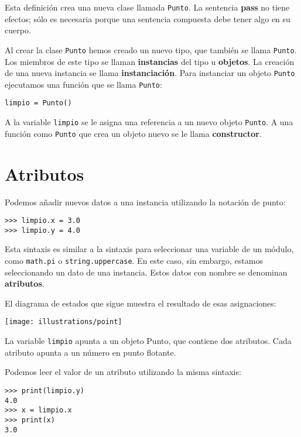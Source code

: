 Esta definición crea una nueva clase llamada \texttt{Punto}. La sentencia
\textbf{pass} no tiene efectos; sólo es necesaria porque una sentencia
compuesta debe tener algo en su cuerpo.

Al crear la clase \texttt{Punto} hemos creado un nuevo tipo, que también
se llama \texttt{Punto}. Los miembros de este tipo se llaman \textbf{instancias}
del tipo u \textbf{objetos}. La creación de una nueva instancia se
llama \textbf{instanciación}. Para instanciar un objeto \texttt{Punto}
ejecutamos una función que se llama \texttt{Punto}:

  
\begin{lstlisting}
limpio = Punto()
\end{lstlisting}

A la variable \texttt{limpio} se le asigna una referencia a un nuevo
objeto \texttt{Punto}. A una función como \texttt{Punto} que crea
un objeto nuevo se le llama \textbf{constructor}.

\section{Atributos}


Podemos añadir nuevos datos a una instancia utilizando la notación
de punto:
\begin{lstlisting}
>>> limpio.x = 3.0
>>> limpio.y = 4.0
\end{lstlisting}

Esta sintaxis es similar a la sintaxis para seleccionar una variable
de un módulo, como \texttt{math.pi} o \texttt{string.uppercase}. En
este caso, sin embargo, estamos seleccionando un dato de una instancia.
Estos datos con nombre se denominan \textbf{atributos}.

El diagrama de estados que sigue muestra el resultado de esas asignaciones:

\beforefig \centerline{\texttt{[image: illustrations/point]}}
\afterfig

La variable \texttt{limpio} apunta a un objeto Punto, que contiene
dos atributos. Cada atributo apunta a un número en punto flotante.

Podemos leer el valor de un atributo utilizando la misma sintaxis:

\begin{lstlisting}
>>> print(limpio.y)
4.0
>>> x = limpio.x
>>> print(x)
3.0
\end{lstlisting}


